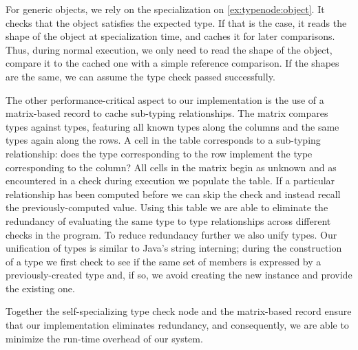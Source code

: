 For generic objects, we rely on the specialization on \cref{ex:typenode:object}.
It checks that the object satisfies the expected type.
If that is the case, it reads the shape of the object at specialization time,
and caches it for later comparisons.
Thus, during normal execution,
we only need to read the shape of the object, compare it to the cached one
with a simple reference comparison.
If the shapes are the same, we can assume the type check passed successfully.

The other performance-critical aspect to our implementation
is the use of a matrix-based record to cache sub-typing relationships.
The matrix compares types against types,
featuring all known types along the columns and the same types again along the rows.
A cell in the table corresponds to a sub-typing relationship:
does the type corresponding to the row implement
the type corresponding to the column?
All cells in the matrix begin as unknown and as 
encountered in a check during execution
we populate the table.
If a particular relationship has been computed before
we can skip the check and instead recall the previously-computed value.
Using this table we are able to eliminate the redundancy of evaluating
the same type to type relationships across different checks in the program. To reduce redundancy further we also unify types.
Our unification of types is similar to Java's string interning; 
during the construction of a type we first check to see if the same
set of members is expressed by a previously-created type and, if so,
we avoid creating the new instance and provide the existing one.

Together the self-specializing type check node and the matrix-based record
ensure that our implementation eliminates redundancy, and
consequently, we are able to minimize the run-time overhead of our system. 

